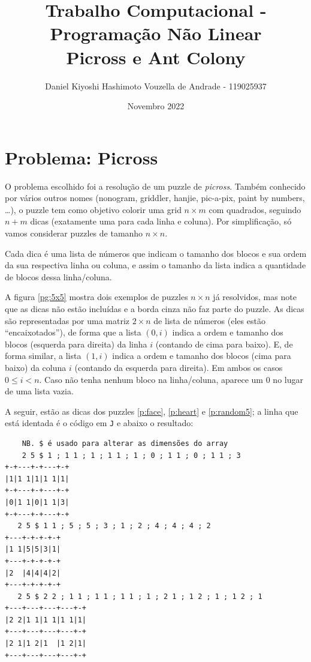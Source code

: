 \documentclass{article}
\title{Trabalho Computacional - Programação Não Linear\\
Picross e Ant Colony}
\author{Daniel Kiyoshi Hashimoto Vouzella de Andrade - 119025937}
\date{Novembro 2022}
\newcommand{\lang}{\texttt{J}}
\begin{document}
\maketitle

\section{Problema: Picross}

O problema escolhido foi a resolução de
um puzzle de \emph{picross}.
Também conhecido por vários outros nomes
(nonogram, griddler, hanjie, pic-a-pix,
paint by numbers, \dots),
o puzzle tem como objetivo colorir
uma grid \(n \times m\) com quadrados,
seguindo \(n + m\) dicas
(exatamente uma para cada linha e coluna).
Por simplificação, só vamos considerar
puzzles de tamanho \(n \times n\).

Cada dica é uma lista de números
que indicam o tamanho dos blocos e
sua ordem da sua respectiva linha ou coluna,
e assim o tamanho da lista
indica a quantidade de blocos dessa linha/coluna.

A figura \ref{pg:5x5} mostra dois exemplos
de puzzles \(n \times n\) já resolvidos,
mas note que as dicas não estão incluídas e
a borda cinza não faz parte do puzzle.
As dicas são representadas por uma matriz
\(2 \times n\) de lista de números
(eles estão ``encaixotados''),
de forma que a lista \((0,i)\)
indica a ordem e tamanho dos blocos
(esquerda para direita)
da linha \(i\)
(contando de cima para baixo).
E, de forma similar,
a lista \((1,i)\)
indica a ordem e tamanho dos blocos
(cima para baixo)
da coluna \(i\)
(contando da esquerda para direita).
Em ambos os casos \(0 \le i < n\).
Caso não tenha nenhum bloco na linha/coluna,
aparece um \(0\) no lugar de uma lista vazia.

A seguir, estão as dicas dos puzzles
\ref{p:face}, \ref{p:heart} e \ref{p:random5};
a linha que está identada é o código em \lang{}
e abaixo o resultado:
\begin{verbatim}
    NB. $ é usado para alterar as dimensões do array
    2 5 $ 1 ; 1 1 ; 1 ; 1 1 ; 1 ; 0 ; 1 1 ; 0 ; 1 1 ; 3
+-+---+-+---+-+
|1|1 1|1|1 1|1|
+-+---+-+---+-+
|0|1 1|0|1 1|3|
+-+---+-+---+-+
   2 5 $ 1 1 ; 5 ; 5 ; 3 ; 1 ; 2 ; 4 ; 4 ; 4 ; 2
+---+-+-+-+-+
|1 1|5|5|3|1|
+---+-+-+-+-+
|2  |4|4|4|2|
+---+-+-+-+-+
   2 5 $ 2 2 ; 1 1 ; 1 1 ; 1 1 ; 1 ; 2 1 ; 1 2 ; 1 ; 1 2 ; 1
+---+---+---+---+-+
|2 2|1 1|1 1|1 1|1|
+---+---+---+---+-+
|2 1|1 2|1  |1 2|1|
+---+---+---+---+-+
\end{verbatim}
\end{document}
